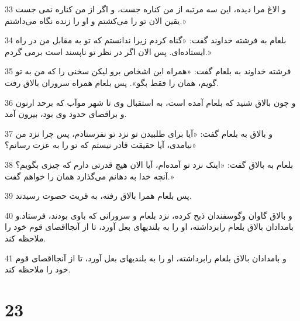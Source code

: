 \par 33 و الاغ مرا دیده، این سه مرتبه از من کناره جست، و اگر از من کناره نمی جست یقین الان تو را می‌کشتم و او را زنده نگاه می‌داشتم.»
\par 34 بلعام به فرشته خداوند گفت: «گناه کردم زیرا ندانستم که تو به مقابل من در راه ایستاده‌ای. پس الان اگر در نظر تو ناپسند است برمی گردم.»
\par 35 فرشته خداوند به بلعام گفت: «همراه این اشخاص برو لیکن سخنی را که من به تو گویم، همان را فقط بگو». پس بلعام همراه سروران بالاق رفت.
\par 36 و چون بالاق شنید که بلعام آمده است، به استقبال وی تا شهر موآب که برحد ارنون و براقصای حدود وی بود، بیرون آمد.
\par 37 و بالاق به بلعام گفت: «آیا برای طلبیدن تو نزد تو نفرستادم، پس چرا نزد من نیامدی، آیا حقیقت قادر نیستم که تو را به عزت رسانم؟»
\par 38 بلعام به بالاق گفت: «اینک نزد تو آمده‌ام، آیا الان هیچ قدرتی دارم که چیزی بگویم؟ آنچه خدا به دهانم می‌گذارد همان را خواهم گفت.»
\par 39 پس بلعام همرا بالاق رفته، به قریت حصوت رسیدند.
\par 40 و بالاق گاوان وگوسفندان ذبح کرده، نزد بلعام و سرورانی که باوی بودند، فرستاد.و بامدادان بالاق بلعام رابرداشته، او را به بلندیهای بعل آورد، تا از آنجااقصای قوم خود را ملاحظه کند.
\par 41 و بامدادان بالاق بلعام رابرداشته، او را به بلندیهای بعل آورد، تا از آنجااقصای قوم خود را ملاحظه کند.
 
\chapter{23}

